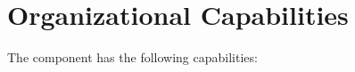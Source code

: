 \chapter{Organizational Capabilities}\label{ch:ekg-mm-d-5}

The  component has the following capabilities:

\begin{itemize}[leftmargin=.5in]
\end{itemize}









